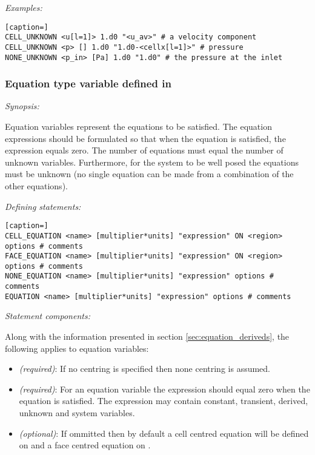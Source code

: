\emph{Examples:}

\begin{lstlisting}[caption=]
CELL_UNKNOWN <u[l=1]> 1.d0 "<u_av>" # a velocity component
CELL_UNKNOWN <p> [] 1.d0 "1.d0-<cellx[l=1]>" # pressure
NONE_UNKNOWN <p_in> [Pa] 1.d0 "1.d0" # the pressure at the inlet
\end{lstlisting}

\subsubsection{Equation type variable defined in }

\emph{Synopsis:}

Equation variables represent the equations to be satisfied.  The equation expressions should be formulated so that when the equation is satisfied, the expression equals zero.  The number of equations must equal the number of unknown variables.  Furthermore, for the system to be well posed the equations must be unknown (no single equation can be made from a combination of the other equations).

\emph{Defining statements:}

\begin{lstlisting}[caption=]
CELL_EQUATION <name> [multiplier*units] "expression" ON <region> options # comments
FACE_EQUATION <name> [multiplier*units] "expression" ON <region> options # comments
NONE_EQUATION <name> [multiplier*units] "expression" options # comments
EQUATION <name> [multiplier*units] "expression" options # comments
\end{lstlisting}

\emph{Statement components:}

Along with the information presented in section \ref{sec:equation_deriveds}, the following applies to equation variables:

\begin{itemize}
\item {} \emph{(required)}:  If no centring is specified then none centring is assumed.
\item {} \emph{(required)}:  For an equation variable the expression should equal zero when the equation is satisfied.  The expression may contain constant, transient, derived, unknown and system variables.
\item {} \emph{(optional)}:  If ommitted then by default a cell centred equation will be defined on  and a face centred equation on .
\end{itemize}

